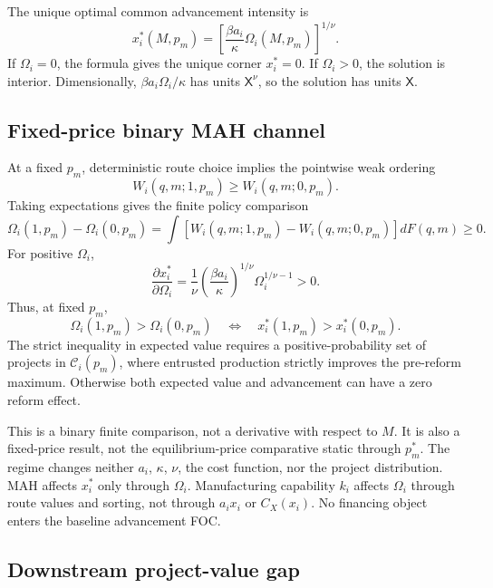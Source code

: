 The unique optimal common advancement intensity is
\begin{equation}
  x_i^*(M,p_m)
  =
  \left[
    \frac{\beta a_i}{\kappa}
    \Omega_i(M,p_m)
  \right]^{1/\nu}.
  \label{eq:p05-optimal-advancement}
\end{equation}
If \(\Omega_i=0\), the formula gives the unique corner \(x_i^*=0\).
If \(\Omega_i>0\), the solution is interior. Dimensionally,
\(\beta a_i\Omega_i/\kappa\) has units \(\mathsf X^\nu\), so the
solution has units \(\mathsf X\).

\subsection{Fixed-price binary MAH channel}
\label{subsec:p05-binary-channel}

At a fixed \(p_m\), deterministic route choice implies the pointwise weak ordering
\[
  W_i(q,m;1,p_m)
  \geq W_i(q,m;0,p_m).
\]
Taking expectations gives the finite policy comparison
\begin{equation}
  \Omega_i(1,p_m)-\Omega_i(0,p_m)
  =
  \int
  \left[
    W_i(q,m;1,p_m)
    -W_i(q,m;0,p_m)
  \right]dF(q,m)
  \geq0.
  \label{eq:p05-binary-channel}
\end{equation}
For positive \(\Omega_i\),
\[
  \frac{\partial x_i^*}{\partial\Omega_i}
  =
  \frac{1}{\nu}
  \left(\frac{\beta a_i}{\kappa}\right)^{1/\nu}
  \Omega_i^{1/\nu-1}
  >0.
\]
Thus, at fixed \(p_m\),
\[
  \Omega_i(1,p_m)>\Omega_i(0,p_m)
  \quad\Longleftrightarrow\quad
  x_i^*(1,p_m)>x_i^*(0,p_m).
\]
The strict inequality in expected value requires a positive-probability set
of projects in \(\mathcal C_i(p_m)\), where entrusted production strictly
improves the pre-reform maximum. Otherwise both
expected value and advancement can have a zero reform effect.

This is a binary finite comparison, not a derivative with respect to \(M\).
It is also a fixed-price result, not the equilibrium-price comparative static
through \(p_m^*\). The regime changes neither \(a_i\), \(\kappa\), \(\nu\),
the cost function, nor the project distribution. MAH affects
\(x_i^*\) only through \(\Omega_i\). Manufacturing capability \(k_i\) affects
\(\Omega_i\) through route values and sorting, not through
\(a_ix_i\) or \(C_X(x_i)\). No financing object enters the baseline
advancement FOC.

\subsection{Downstream project-value gap}
\label{subsec:p05-value-gap}

